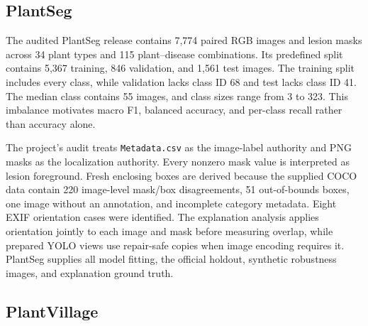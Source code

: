 \documentclass[conference]{IEEEtran}
\begin{document}
\begin{table}[t]
\caption{Dataset characteristics and experimental roles. Counts describe the audited local
representations used by the project.}
\label{tab:datasets}
\centering
{}
\end{table}

\subsection{PlantSeg}

The audited PlantSeg release contains 7,774 paired RGB images and lesion masks across 34 plant types
and 115 plant--disease combinations. Its predefined split contains 5,367 training, 846 validation,
and 1,561 test images. The training split includes every class, while validation lacks class ID 68
and test lacks class ID 41. The median class contains 55 images, and class sizes range from 3 to 323.
This imbalance motivates macro F1, balanced accuracy, and per-class recall rather than accuracy alone.

The project's audit treats \texttt{Metadata.csv} as the image-label authority and PNG masks as the
localization authority. Every nonzero mask value is interpreted as lesion foreground. Fresh
enclosing boxes are derived because the supplied COCO data contain 220 image-level mask/box
disagreements, 51 out-of-bounds boxes, one image without an annotation, and incomplete category
metadata. Eight EXIF orientation cases were identified. The explanation analysis applies
orientation jointly to each image and mask before measuring overlap, while prepared YOLO views use
repair-safe copies when image encoding requires it. PlantSeg supplies all model fitting, the
official holdout, synthetic robustness images, and explanation ground truth.

\subsection{PlantVillage}
\end{document}
